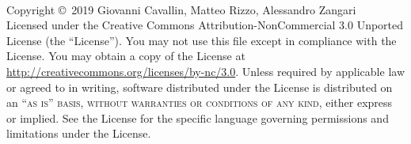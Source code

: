 \documentclass[11pt,fleqn]{book}
\begin{document}
	
\captionsetup{justification=centering}

\onehalfspacing


\begingroup

\thispagestyle{empty} 


\vfill

\endgroup


\newpage
~\vfill
\thispagestyle{empty}

\noindent Copyright \copyright\ 2019 Giovanni Cavallin, Matteo Rizzo, Alessandro Zangari \\ %

\noindent Licensed under the Creative Commons Attribution-NonCommercial 3.0 Unported License (the ``License''). You may not use this file except in compliance with the License. You may obtain a copy of the License at \url{http://creativecommons.org/licenses/by-nc/3.0}. Unless required by applicable law or agreed to in writing, software distributed under the License is distributed on an \textsc{``as is'' basis, without warranties or conditions of any kind}, either express or implied. See the License for the specific language governing permissions and limitations under the License.\\ %
\end{document}
